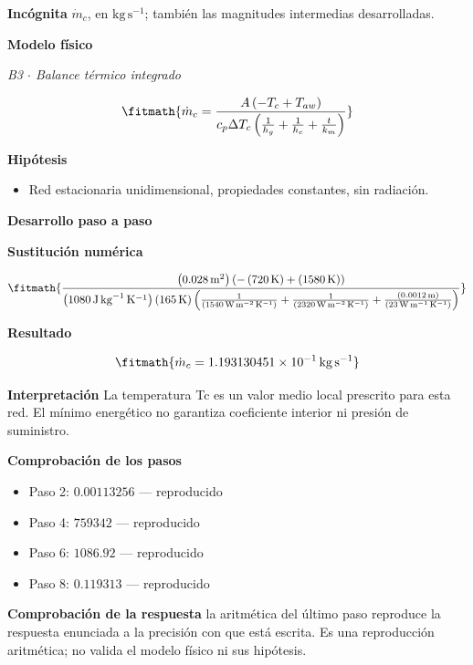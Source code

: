 \documentclass[10pt,openany]{book}
\begin{document}
\noindent\textbf{Incógnita}
$\dot{m}_c$, en $\mathrm{kg\,s^{-1}}$; también las magnitudes intermedias desarrolladas.

\noindent\textbf{Modelo físico}

\noindent\textit{B3 \(\cdot\) Balance térmico integrado}

\[
\fitmath{\dot{m}_c=\frac{A \left(- T_c + T_{aw}\right)}{c_p \Delta T_c \left(\frac{1}{h_g} + \frac{1}{h_c} + \frac{t}{k_m}\right)}}
\]

\noindent\textbf{Hipótesis}
\begin{itemize}
\item Red estacionaria unidimensional, propiedades constantes, sin radiación.
\end{itemize}

\noindent\textbf{Desarrollo paso a paso}



\noindent\textbf{Sustitución numérica}

\[
\fitmath{\frac{\left(0.028\,\mathrm{m}^{2}\right) \left(- \left(720\,\mathrm{K}\right) + \left(1580\,\mathrm{K}\right)\right)}{\left(1080\,\mathrm{J}\,\mathrm{kg}^{-1}\,\mathrm{K}^{-1}\right) \left(165\,\mathrm{K}\right) \left(\frac{1}{\left(1540\,\mathrm{W}\,\mathrm{m}^{-2}\,\mathrm{K}^{-1}\right)} + \frac{1}{\left(2320\,\mathrm{W}\,\mathrm{m}^{-2}\,\mathrm{K}^{-1}\right)} + \frac{\left(0.0012\,\mathrm{m}\right)}{\left(23\,\mathrm{W}\,\mathrm{m}^{-1}\,\mathrm{K}^{-1}\right)}\right)}}
\]

\noindent\textbf{Resultado}

\[
\fitmath{\dot{m}_c=1.193130451\times10^{-1}\,\mathrm{kg}\,\mathrm{s}^{-1}}
\]

\noindent\textbf{Interpretación}
La temperatura Tc es un valor medio local prescrito para esta red. El mínimo energético no garantiza coeficiente interior ni presión de suministro.

\noindent\textbf{Comprobación de los pasos}
\begin{itemize}
\item Paso 2: $0.00113256$ — reproducido
\item Paso 4: $759342$ — reproducido
\item Paso 6: $1086.92$ — reproducido
\item Paso 8: $0.119313$ — reproducido
\end{itemize}

\noindent\textbf{Comprobación de la respuesta} la aritmética del último paso reproduce la respuesta enunciada a la precisión con que está escrita. Es una reproducción aritmética; no valida el modelo físico ni sus hipótesis.
\end{document}
